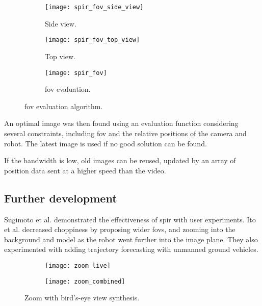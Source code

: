   \begin{figure}[h]
    \centering
    \begin{subfigure}[b]{0.3\textwidth}
      \texttt{[image: spir\_fov\_side\_view]}
      \caption{Side view.}
      \label{fig:spir_fov_side_view}
    \end{subfigure}
    \hfill
    \begin{subfigure}[b]{0.3\textwidth}
      \texttt{[image: spir\_fov\_top\_view]}
      \caption{Top view.}
      \label{fig:spir_fov_top_view}
    \end{subfigure}
    \hfill
    \begin{subfigure}[b]{0.3\textwidth}
      \texttt{[image: spir\_fov]}
      \caption{\Gls{fov} evaluation.}
      \label{fig:spir_fov_flowchart}
    \end{subfigure}
    \caption[\acrshort{spir} \gls{fov} evaluation algorithm]{\Gls{fov} evaluation algorithm.\cite{shiroma2004}}
    \label{fig:spir_fov}
  \end{figure}

  An optimal image was then found using an evaluation function considering several constraints, including \gls{fov} and the relative positions of the camera and robot.
  The latest image is used if no good solution can be found.

  If the bandwidth is low, old images can be reused, updated by an array of position data sent at a higher speed than the video.

  \subsection{Further development}
    Sugimoto et al. demonstrated the effectiveness of \gls{spir} with user experiments.\cite{sugimoto2005}
    Ito et al. decreased choppiness by proposing wider \glspl{fov}, and zooming into the background and model as the robot went further into the image plane.\cite{ito2008}
    They also experimented with adding trajectory forecasting with unmanned ground vehicles.

    \begin{figure}[h]
      \centering
      \begin{subfigure}[b]{0.45\textwidth}
	\texttt{[image: zoom\_live]}
      \end{subfigure}
      \hfill
      \begin{subfigure}[b]{0.45\textwidth}
	\texttt{[image: zoom\_combined]}
      \end{subfigure}
      \caption[\acrshort{spir} with zoom]{Zoom with bird's-eye view synthesis.\cite{ito2008}}
      \label{fig:zoom_results}
    \end{figure}

